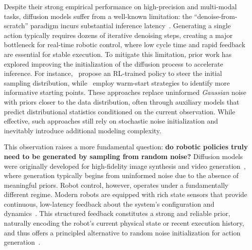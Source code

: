 \documentclass[onecolumn]{fairmeta}
\begin{document}
Despite their strong empirical performance on high-precision and multi-modal tasks, diffusion models suffer from a well-known limitation: the ``denoise-from-scratch'' paradigm incurs substantial inference latency~\citep{pan2025much}. Generating a single action typically requires dozens of iterative denoising steps, creating a major bottleneck for real-time robotic control, where low cycle time and rapid feedback are essential for stable execution.
To mitigate this limitation, prior work has explored improving the initialization of the diffusion process to accelerate inference. For instance,~\citet{steeringdp} propose an RL-trained policy to steer the initial sampling distribution, while~\citet{warmstarts} employ warm-start strategies to identify more informative starting points. These approaches replace uninformed \textit{Gaussian} noise with priors closer to the data distribution, often through auxiliary models that predict distributional statistics conditioned on the current observation. While effective, such approaches still rely on stochastic noise initialization and inevitably introduce additional modeling complexity.

This observation raises a more fundamental question: \textbf{do robotic policies truly need to be generated by sampling from random noise?} Diffusion models were originally developed for high-fidelity image synthesis and video generation~\citep{ddpm,song2020denoising,rombach2022high,flowmatching,rectifiedflow,blattmann2023stable}, where generation typically begins from uninformed noise due to the absence of meaningful priors. Robot control, however, operates under a fundamentally different regime. Modern robots are equipped with rich state sensors that provide continuous, low-latency feedback about the system’s configuration and dynamics~\citep{jia2024feedback, jia2024learning}. This structured feedback constitutes a strong and reliable prior, naturally encoding the robot’s current physical state or recent execution history, and thus offers a principled alternative to random noise initialization for action generation~\citep{jia2025foreseer}.

\end{document}
